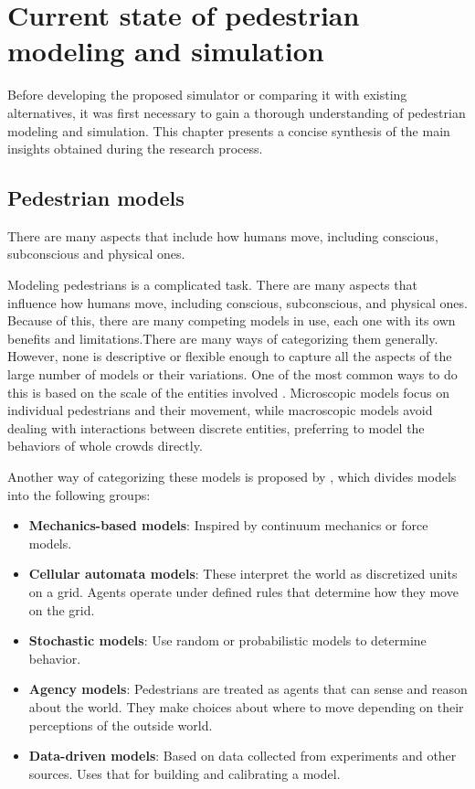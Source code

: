 \documentclass[twoside, 11pt]{article}
\begin{document}
\section{Current state of pedestrian modeling and simulation} \label{sec:overview}

Before developing the proposed simulator or comparing it with existing alternatives, it was first necessary to gain a thorough understanding of pedestrian modeling and simulation. This chapter presents a concise synthesis of the main insights obtained during the research process.

\subsection{Pedestrian models}

There are many aspects that include how humans move, including conscious, subconscious and physical ones.

Modeling pedestrians is a complicated task. There are many aspects that influence how humans move, including conscious, subconscious, and physical ones. Because of this, there are many competing models in use, each one with its own benefits and limitations.There are many ways of categorizing them generally. However, none is descriptive or flexible enough to capture all the aspects of the large number of models or their variations. One of the most common ways to do this is based on the scale of the entities involved \cite{kleinmeierVadereOpenSourceSimulation2019}. Microscopic models focus on individual pedestrians and their movement, while macroscopic models avoid dealing with interactions between discrete entities, preferring to model the behaviors of whole crowds directly.

Another way of categorizing these models is proposed by \cite{martinez-gilModelingEvaluationScale2017}, which divides models into the following groups:

\begin{itemize}
  \item \textbf{Mechanics-based models}: Inspired by continuum mechanics or force models.
  \item \textbf{Cellular automata models}: These interpret the world as discretized units on a grid. Agents operate under defined rules that determine how they move on the grid.
  \item \textbf{Stochastic models}: Use random or probabilistic models to determine behavior.
  \item \textbf{Agency models}: Pedestrians are treated as agents that can sense and reason about the world. They make choices about where to move depending on their perceptions of the outside world.
  \item \textbf{Data-driven models}: Based on data collected from experiments and other sources. Uses that for building and calibrating a model.
\end{itemize}
\end{document}

